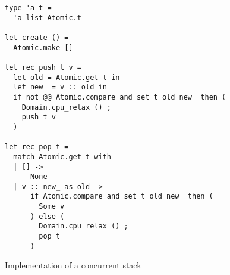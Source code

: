 \begin{figure}[htb]
\begin{verbatim}
type 'a t =
  'a list Atomic.t

let create () =
  Atomic.make []

let rec push t v =
  let old = Atomic.get t in
  let new_ = v :: old in
  if not @@ Atomic.compare_and_set t old new_ then (
    Domain.cpu_relax () ;
    push t v
  )

let rec pop t =
  match Atomic.get t with
  | [] ->
      None
  | v :: new_ as old ->
      if Atomic.compare_and_set t old new_ then (
        Some v
      ) else (
        Domain.cpu_relax () ;
        pop t
      )
\end{verbatim}
\caption{Implementation of a concurrent stack}
\label{fig:stack}
\end{figure}